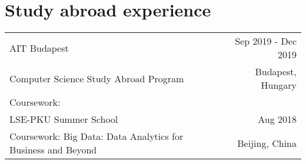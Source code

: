 
\section{Study abroad experience}





\begin{tabularx}{\linewidth}{@{}l r@{}}




AIT Budapest                            &   \hfill Sep 2019 - Dec 2019     \\
Computer Science Study Abroad Program   &   \hfill  Budapest, Hungary\\ 
Coursework:   & \\




LSE-PKU Summer School                   &   \hfill Aug 2018\\
Coursework: Big Data: Data Analytics for Business and Beyond   &  \hfill  Beijing, China \\ 



\end{tabularx}